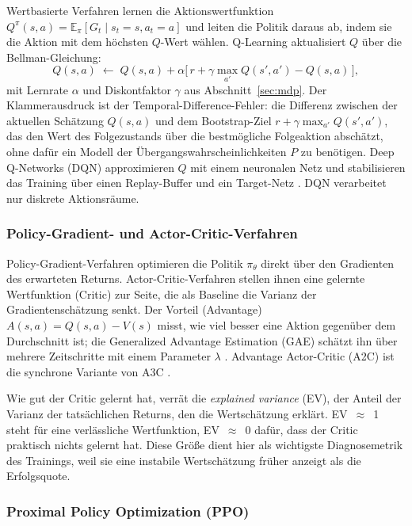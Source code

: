 \documentclass[11pt,a4paper]{article}
\begin{document}
Wertbasierte Verfahren lernen die Aktionswertfunktion
$Q^\pi(s,a) = \mathbb{E}_\pi[G_t \mid s_t=s, a_t=a]$ und leiten die Politik
daraus ab, indem sie die Aktion mit dem höchsten $Q$-Wert wählen. Q-Learning
aktualisiert $Q$ über die Bellman-Gleichung:
\begin{equation}
Q(s,a) \;\leftarrow\; Q(s,a) + \alpha \Big[\, r + \gamma \max_{a'} Q(s',a') - Q(s,a) \,\Big],
\end{equation}
mit Lernrate $\alpha$ und Diskontfaktor $\gamma$ aus Abschnitt~\ref{sec:mdp}.
Der Klammerausdruck ist der Temporal-Difference-Fehler: die Differenz
zwischen der aktuellen Schätzung $Q(s,a)$ und dem Bootstrap-Ziel
$r + \gamma \max_{a'} Q(s',a')$, das den Wert des Folgezustands über die
bestmögliche Folgeaktion abschätzt, ohne dafür ein Modell der
Übergangswahrscheinlichkeiten $P$ zu benötigen. Deep Q-Networks (DQN)
approximieren $Q$ mit einem neuronalen Netz und stabilisieren das Training
über einen Replay-Buffer und ein Target-Netz \cite{mnih2015dqn}. DQN
verarbeitet nur diskrete Aktionsräume.

\subsubsection{Policy-Gradient- und Actor-Critic-Verfahren}

Policy-Gradient-Verfahren optimieren die Politik $\pi_\theta$ direkt über den
Gradienten des erwarteten Returns. Actor-Critic-Verfahren stellen ihnen eine
gelernte Wertfunktion (Critic) zur Seite, die als Baseline die Varianz der
Gradientenschätzung senkt. Der Vorteil (Advantage)
$A(s,a) = Q(s,a) - V(s)$ misst, wie viel besser eine Aktion gegenüber dem
Durchschnitt ist; die Generalized Advantage Estimation (GAE) schätzt ihn über
mehrere Zeitschritte mit einem Parameter $\lambda$ \cite{schulman2016gae}.
Advantage Actor-Critic (A2C) ist die synchrone Variante von A3C
\cite{mnih2016a3c}.

Wie gut der Critic gelernt hat, verrät die \emph{explained variance} (EV), der
Anteil der Varianz der tatsächlichen Returns, den die Wertschätzung erklärt.
EV~$\approx$~1 steht für eine verlässliche Wertfunktion, EV~$\approx$~0 dafür,
dass der Critic praktisch nichts gelernt hat. Diese Größe dient hier als
wichtigste Diagnosemetrik des Trainings, weil sie eine instabile Wertschätzung
früher anzeigt als die Erfolgsquote.

\subsubsection{Proximal Policy Optimization (PPO)}
\label{sec:ppo}
\end{document}
